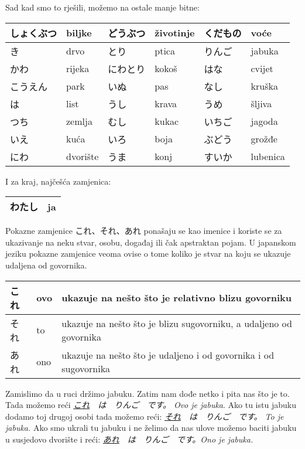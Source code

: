 	Sad kad smo to rješili, možemo na ostale manje bitne:
	
	\vspace{10pt}
	\begin{tabular}{|l|l|l|l|l|l|}
		\hline
		しょくぶつ&biljke&どうぶつ&životinje&くだもの&voće\\\hline
		き&drvo&とり&ptica&りんご&jabuka\\\hline
		かわ&rijeka&にわとり&kokoš&はな&cvijet\\\hline
		こうえん&park&いぬ&pas&なし&kruška\\\hline
		は&list&うし&krava&うめ&šljiva\\\hline
		つち&zemlja&むし&kukac&いちご&jagoda\\\hline
		いえ&kuća&いろ&boja&ぶどう&grožđe\\\hline
		にわ&dvorište&うま&konj&すいか&lubenica\\\hline
	\end{tabular}

	
	\vspace{10pt}
	I za kraj, najčešća zamjenica:
	
	\vspace{10pt}
	\begin{tabular}{|l|l|}
		\hline
		わたし&ja\\\hline
	\end{tabular}
	\vspace{10pt}

	

	Pokazne zamjenice これ、それ、あれ ponašaju se kao imenice i koriste se za ukazivanje na neku stvar, osobu, događaj ili čak apstraktan pojam. U japanskom jeziku pokazne zamjenice veoma ovise o tome koliko je stvar na koju se ukazuje udaljena od govornika.
	
	\vspace{10pt}
	\begin{tabular}{|l|l|l|}
		\hline
		これ&ovo&ukazuje na nešto što je relativno blizu govorniku\\\hline
		それ&to&ukazuje na nešto što je blizu sugovorniku, a udaljeno od govornika\\\hline
		あれ&ono&ukazuje na nešto što je udaljeno i od govornika i od sugovornika\\\hline
	\end{tabular}
	\vspace{10pt}
	
	Zamislimo da u ruci držimo jabuku. Zatim nam dođe netko i pita nas što je to.
	Tada možemo reći \textit{\underline{これ}　は　りんご　です。 Ovo je jabuka}. Ako tu istu jabuku dodamo toj drugoj osobi tada možemo reći:	\textit{ \underline{それ}　は　りんご　です。 To je jabuka.} Ako smo ukrali tu jabuku i ne želimo da nas ulove možemo baciti jabuku u susjedovo dvorište i reći: \textit{\underline{あれ}　は　りんご　です。Ono je jabuka.}
	
